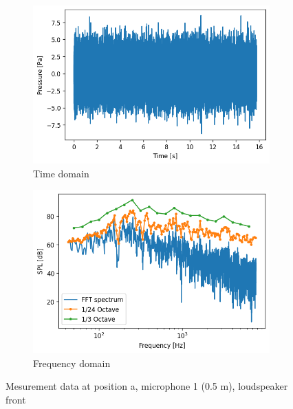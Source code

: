 \begin{figure}[H]
    \centering
    \begin{subfigure}[b]{0.6\textwidth}
        \centering
        \includegraphics[width=\linewidth]{fig/time_signal.png}
        \caption{Time domain}
        \label{fig:timedomain}
    \end{subfigure}

    \begin{subfigure}[b]{0.6\textwidth}
        \centering
        \includegraphics[width=\linewidth]{fig/fft_spectra.png}
        \caption{Frequency domain}
        \label{fig:frequencydomain}
    \end{subfigure}
    
    \caption{Mesurement data at position a, microphone 1 (0.5 m), loudspeaker front}
    \label{fig:measurementsignal}
\end{figure}


